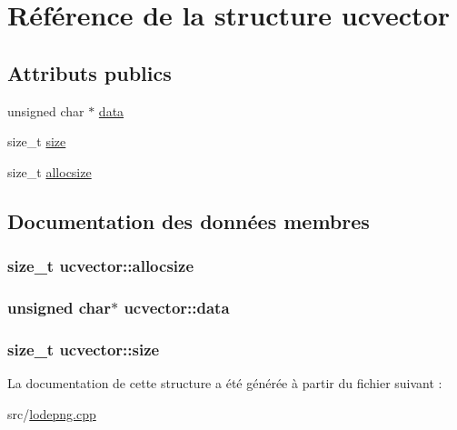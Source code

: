 \hypertarget{structucvector}{}\section{Référence de la structure ucvector}
\label{structucvector}
\subsection*{Attributs publics}
\begin{DoxyCompactItemize}
\item 
unsigned char $\ast$ \hyperlink{structucvector_ace794c5713208c5a20f21762cd87c919}{data}
\item 
size\+\_\+t \hyperlink{structucvector_a27c99c34de0c5b3ca0c242d402c69499}{size}
\item 
size\+\_\+t \hyperlink{structucvector_a235168baac13f0c78bd3e309dc170f90}{allocsize}
\end{DoxyCompactItemize}


\subsection{Documentation des données membres}
\hypertarget{structucvector_a235168baac13f0c78bd3e309dc170f90}{}
\subsubsection[{allocsize}]{\setlength{\rightskip}{0pt plus 5cm}size\+\_\+t ucvector\+::allocsize}\label{structucvector_a235168baac13f0c78bd3e309dc170f90}
\hypertarget{structucvector_ace794c5713208c5a20f21762cd87c919}{}
\subsubsection[{data}]{\setlength{\rightskip}{0pt plus 5cm}unsigned char$\ast$ ucvector\+::data}\label{structucvector_ace794c5713208c5a20f21762cd87c919}
\hypertarget{structucvector_a27c99c34de0c5b3ca0c242d402c69499}{}
\subsubsection[{size}]{\setlength{\rightskip}{0pt plus 5cm}size\+\_\+t ucvector\+::size}\label{structucvector_a27c99c34de0c5b3ca0c242d402c69499}


La documentation de cette structure a été générée à partir du fichier suivant \+:\begin{DoxyCompactItemize}
\item 
src/\hyperlink{lodepng_8cpp}{lodepng.\+cpp}\end{DoxyCompactItemize}
